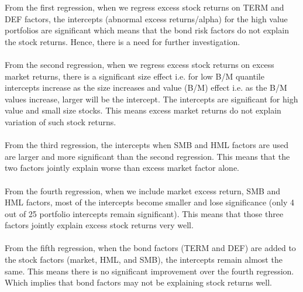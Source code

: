 \documentclass[11pt]{article}
\begin{document}
From the first regression, when we regress excess stock returns on TERM and DEF factors, the intercepts (abnormal excess returns/alpha) for the high value portfolios are significant which means that the bond risk factors do not explain the stock returns. Hence, there is a need for further investigation.

\paragraph{} From the second regression, when we regress excess stock returns on excess market returns, there is a significant size effect i.e. for low B/M quantile intercepts increase as the size increases and value (B/M) effect i.e. as the B/M values increase, larger will be the intercept. The intercepts are significant for high value and small size stocks. This means excess market returns do not explain variation of such stock returns.

\paragraph{} From the third regression, the intercepts when SMB and HML factors are used are larger and more significant than the second regression. This means that the two factors jointly explain worse than excess market factor alone.

\paragraph{} From the fourth regression, when we include market excess return, SMB and HML factors, most of the intercepts become smaller and lose significance (only 4 out of 25 portfolio intercepts remain significant). This means that those three factors jointly explain excess stock returns very well.

\paragraph{} From the fifth regression, when the bond factors (TERM and DEF) are added to the stock factors (market, HML, and SMB), the intercepts remain almost the same. This means there is no significant improvement over the fourth regression. Which implies that bond factors may not be explaining stock returns well.
\end{document}
